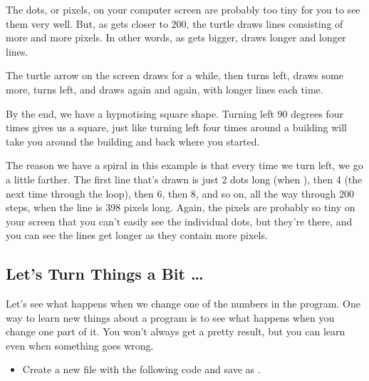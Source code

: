 \documentclass{coderdojo}
\begin{document}
The dots, or pixels, on your computer screen are probably too tiny for you to see them very well. But, as  gets closer to 200, the turtle draws lines consisting of more and more pixels. In other words, as  gets bigger,  draws longer and longer lines.

The turtle arrow on the screen draws for a while, then turns left, draws some more, turns left, and draws again and again, with longer lines each time.

By the end, we have a hypnotising square shape. Turning left 90 degrees four times gives us a square, just like turning left four times around a building will take you around the building and back where you started.

The reason we have a spiral in this example is that every time we turn left, we go a little farther. The first line that's drawn is just 2 dots long (when ), then 4 (the next time through the loop), then 6, then 8, and so on, all the way through 200 steps, when the line is 398 pixels long. Again, the pixels are probably so tiny on your screen that you can't easily see the individual dots, but they're there, and you can see the lines get longer as they contain more pixels.

\subsection{Let's Turn Things a Bit \ldots}

Let's see what happens when we change one of the numbers in the program. One way to learn new things about a program is to see what happens when you change one part of it. You won't always get a pretty result, but you can learn even when something goes wrong.


\begin{itemize}
\item[\todoSymbol] \color{todo}
Create a new file with the following code and save as .
\end{itemize}
\end{document}
